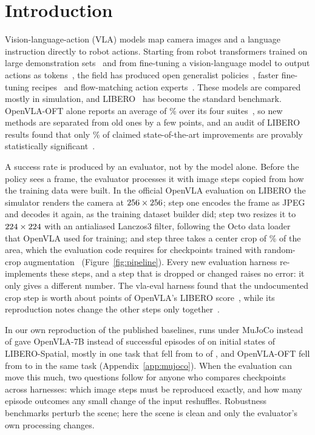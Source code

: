 \section{Introduction}
\label{sec:intro}

Vision-language-action (VLA) models map camera images and a language instruction directly to robot actions. Starting from robot transformers trained on large demonstration sets~\citep{rt1} and from fine-tuning a vision-language model to output actions as tokens~\citep{rt2}, the field has produced open generalist policies~\citep{octo,openvla}, faster fine-tuning recipes~\citep{oft} and flow-matching action experts~\citep{pi0,pi05,smolvla}. These models are compared mostly in simulation, and LIBERO~\citep{libero} has become the standard benchmark. OpenVLA-OFT alone reports an average of \ExtOftAverage\% over its four suites~\citep{oft}, so new methods are separated from old ones by a few points, and an audit of LIBERO results found that only \ExtJiangSigPct\% of claimed state-of-the-art improvements are provably statistically significant~\citep{jiang2026bench}.

A success rate is produced by an evaluator, not by the model alone. Before the policy sees a frame, the evaluator processes it with image steps copied from how the training data were built. In the official OpenVLA evaluation on LIBERO the simulator renders the camera at $256 \times 256$; step one encodes the frame as JPEG and decodes it again, as the training dataset builder did; step two resizes it to $224 \times 224$ with an antialiased Lanczos3 filter, following the Octo data loader~\citep{octo} that OpenVLA used for training; and step three takes a center crop of \CropAreaPct\% of the area, which the evaluation code requires for checkpoints trained with random-crop augmentation~\citep{openvlacode} (Figure~\ref{fig:pipeline}). Every new evaluation harness re-implements these steps, and a step that is dropped or changed raises no error: it only gives a different number. The vla-eval harness found that the undocumented crop step is worth about \ExtVeCropPts{} points of OpenVLA's LIBERO score~\citep{vlaeval}, while its reproduction notes change the other steps only together~\citep{vlaevalrepo}.

In our own reproduction of the published baselines, runs under MuJoCo \MujocoNewVersion{} instead of \MujocoVersion{} gave OpenVLA-7B \MujocoNewK{} instead of \MujocoOldK{} successful episodes of \PilotPairs{} on initial states \SplitA{} of LIBERO-Spatial, mostly in one task that fell from \MujocoOldTaskFive{} to \MujocoNewTaskFive{} of \PilotStates, and OpenVLA-OFT fell from \OftOldTaskFive{} to \OftNewTaskFive{} in the same task (Appendix~\ref{app:mujoco}). When the evaluation can move this much, two questions follow for anyone who compares checkpoints across harnesses: which image steps must be reproduced exactly, and how many episode outcomes any small change of the input reshuffles. Robustness benchmarks perturb the scene; here the scene is clean and only the evaluator's own processing changes.


